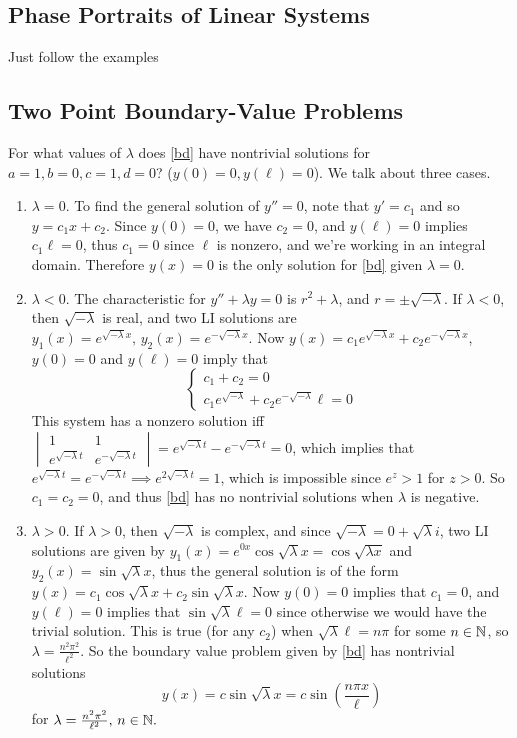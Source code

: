 \subsection{Phase Portraits of Linear Systems}
Just follow the examples

\subsection{Two Point Boundary-Value Problems}
\begin{example}
    For what values of $\lambda$ does \cref{bd} have nontrivial solutions for $a=1,b=0,c=1,d=0$? ($y(0)=0,y(\ell)=0$). We talk about three cases.
    \begin{enumerate}[label=(\roman*)]
        \item $\lambda=0$. To find the general solution of $y''=0$, note that $y'=c_1$ and so $y=c_1x+c_2$. Since $y(0)=0$, we have $c_2=0$, and $y(\ell)=0$ implies $c_1\ell=0$, thus $c_1=0$ since $\ell$ is nonzero, and we're working in an integral domain. Therefore $y(x)=0$ is the only solution for \cref{bd} given $\lambda =0$.
        \item $\lambda<0$. The characteristic for $y''+\lambda y=0$ is $r^2+\lambda$, and $r=\pm \sqrt{-\lambda} $. If $\lambda<0$, then $\sqrt{-\lambda} $ is real, and two LI solutions are $y_1(x)=e^{\sqrt{-\lambda} x},\, y_2(x)=e^{-\sqrt{-\lambda} x}$. Now $y(x)=c_1 e^{\sqrt{-\lambda} x}+c_2e^{-\sqrt{-\lambda} x}$, $y(0)=0$ and $y(\ell)=0$ imply that \[
        \begin{cases}
            c_1+c_2=0\\
            c_1e^{\sqrt{-\lambda}} +c_2e^{-\sqrt{-\lambda}} \ell=0
        \end{cases}
        \] This system has a nonzero solution iff $
        \begin{vmatrix}
            1 & 1 \\ e^{\sqrt{-\lambda} t} & e^{-\sqrt{-\lambda} t}
        \end{vmatrix}=e^{\sqrt{-\lambda} t} - e^{-\sqrt{-\lambda} t}=0$, which implies that $e^{\sqrt{-\lambda} t}=e^{-\sqrt{-\lambda} t}\implies e^{2\sqrt{-\lambda} t}=1$, which is impossible since $e^z>1$ for $z>0$. So $c_1=c_2=0$, and thus \cref{bd} has no nontrivial solutions when $\lambda $ is negative.
    \item $\lambda >0$. If $\lambda>0$, then $\sqrt{-\lambda} $ is complex, and since $\sqrt{-\lambda} =0+\sqrt{\lambda} i$, two LI solutions are given by $y_1(x)=e^{0x}\cos \sqrt{\lambda} x=\cos \sqrt{\lambda x} $ and $y_2(x)=\sin\sqrt{\lambda} x$, thus the general solution is of the form $y(x)=c_1 \cos\sqrt{\lambda} x+c_2\sin \sqrt{\lambda} x$. Now $y(0)=0 $ implies that $c_1=0$, and $y(\ell)=0$ implies that $\sin \sqrt{\lambda} \ell=0$ since otherwise we would have the trivial solution. This is true (for any $c_2$) when $\sqrt{\lambda} \ell=n\pi$ for some $n\in \mathbb{N}$, so $\lambda= \frac{n^2\pi^2}{\ell^2}$. So the boundary value problem given by \cref{bd} has nontrivial solutions \[
            y(x)= c \sin \sqrt{\lambda} x=c \sin\left( \frac{n\pi x}{\ell} \right) 
    \] for $\lambda = \frac{n^2\pi^2}{\ell^2},\, n\in \mathbb{N}   .$
    \end{enumerate}
\end{example}

